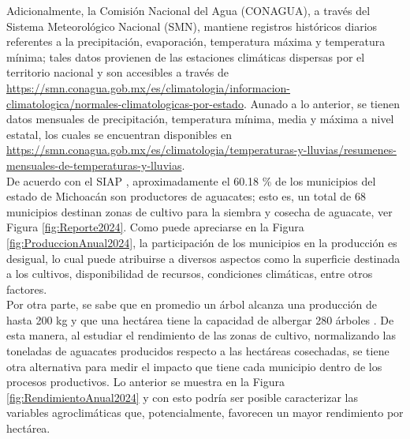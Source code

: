 Adicionalmente, la Comisión Nacional del Agua (CONAGUA), a través del Sistema Meteorológico Nacional (SMN), mantiene registros históricos diarios referentes a la precipitación, evaporación, temperatura máxima y temperatura mínima; tales datos provienen de las estaciones climáticas dispersas por el territorio nacional y son accesibles a través de \url{https://smn.conagua.gob.mx/es/climatologia/informacion-climatologica/normales-climatologicas-por-estado}. Aunado a lo anterior, se tienen datos mensuales de precipitación, temperatura mínima, media y máxima a nivel estatal, los cuales se encuentran disponibles en \url{https://smn.conagua.gob.mx/es/climatologia/temperaturas-y-lluvias/resumenes-mensuales-de-temperaturas-y-lluvias}.\\ 

De acuerdo con el SIAP \cite{AvanceSiembrasCosechas}, aproximadamente el 60.18 \% de los municipios del estado de Michoacán son productores de aguacates; esto es, un total de 68 municipios destinan zonas de cultivo para la siembra y cosecha de aguacate, ver Figura \ref{fig:Reporte2024}. Como puede apreciarse en la Figura \ref{fig:ProduccionAnual2024}, la participación de los municipios en la producción es desigual, lo cual puede atribuirse a diversos aspectos como la superficie destinada a los cultivos, disponibilidad de recursos, condiciones climáticas, entre otros factores.\\

Por otra parte, se sabe que en promedio un árbol alcanza una producción de hasta 200 kg y que una hectárea tiene la capacidad de albergar 280 árboles \cite{Pena-Urquiza_2015}. De esta manera, al estudiar el rendimiento de las zonas de cultivo, normalizando las toneladas de aguacates producidos respecto a las hectáreas cosechadas, se tiene otra alternativa para medir el impacto que tiene cada municipio dentro de los procesos productivos. Lo anterior se muestra en la Figura \ref{fig:RendimientoAnual2024} y con esto podría ser posible caracterizar las variables agroclimáticas que, potencialmente, favorecen un mayor rendimiento por hectárea.\\

